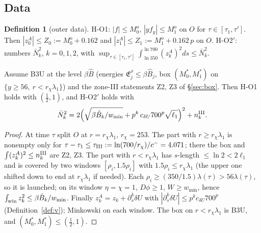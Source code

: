 \documentclass[11pt]{article}
\theoremstyle{definition}\newtheorem{definition}[theorem]{Definition}
\theoremstyle{remark}\newtheorem{remark}[theorem]{Remark}
\newcommand{\E}{\mathfrak E}\newcommand{\B}{\mathfrak B}\newcommand{\Bh}{\hat B}\newcommand{\Eh}{\hat E^A}
\newcommand{\Nb}{\bar N}\newcommand{\oh}{\hat o}
\begin{document}
\subsection{Data}
\begin{definition}[outer data]\label{def:N}
\textup{H-O1:} $|f|\le M_0^o$, $|yf_y|\le M_1^o$ on $O$ for $\tau\in[\tau_1,\tau']$. Then $|z^A_0|\le Z_0:=M_0^o+0.162$ and $|z^A_1|\le Z_1:=M_1^o+0.162\,p$ on $O$.
\textup{H-O2$'$:} numbers $\Nb_k^2$, $k=0,1,2$, with $\sup_{\tau\in[\tau_1,\tau']}\int_{\ln350}^{\ln700}(z^A_k)^2ds\le\Nb_k^2$.
\end{definition}
\begin{lemma}[H-O derived]\label{lem:N}
Assume \textup{B3U} at the level $\beta\Bh$ \textup{(}energies $\E^\rho_j\le\beta\Bh_j$, box $(M_0^*,M_1^*)$ on $\{y\ge56,\ r<r_\chi\lambda_1\}$\textup{)} and the zone-III statements \textup{Z2, Z3} of \S\ref{sec:box}. Then \textup{H-O1} holds with $(\frac12,1)$, and \textup{H-O2$'$} holds with
\[
\Nb_k^2=2\Bigl(\sqrt{\beta\Bh_k/w_{\min}}+p^k\,c_{\delta U}700^p\sqrt{\ell_1}\Bigr)^2+n^{\rm III}_k .
\]
\end{lemma}
\begin{proof}
At time $\tau$ split $O$ at $r=r_\chi\lambda_1$, $r_\chi=253$. The part with $r\ge r_\chi\lambda_1$ is nonempty only for $\tau-\tau_1\le\tau_{\rm III}:=\ln(700/r_\chi)/c^-=4.071$; there the box and $\int(z_k^A)^2\le n^{\rm III}_k$ are Z2, Z3. The part with $r<r_\chi\lambda_1$ has $s$-length $\le\ln2<2\ell_1$ and is covered by two windows $[\rho_i,1.5\rho_i]$ with $1.5\rho_i\le r_\chi\lambda_1$ (the upper one shifted down to end at $r_\chi\lambda_1$ if needed). Each $\rho_i\ge(350/1.5)\lambda(\tau)>56\lambda(\tau)$, so it is launched; on its window $\eta=\chi=1$, $D\phi\ge1$, $W\ge w_{\min}$, hence $\int_{\rm win}z_k^2\le\beta\Bh_k/w_{\min}$. Finally $z^A_k=z_k+\partial_s^k\delta U$ with $|\partial_s^k\delta U|\le p^kc_{\delta U}700^p$ (Definition~\ref{def:v}); Minkowski on each window. The box on $r<r_\chi\lambda_1$ is B3U, and $(M_0^*,M_1^*)\le(\frac12,1)$.
\end{proof}
\end{document}
